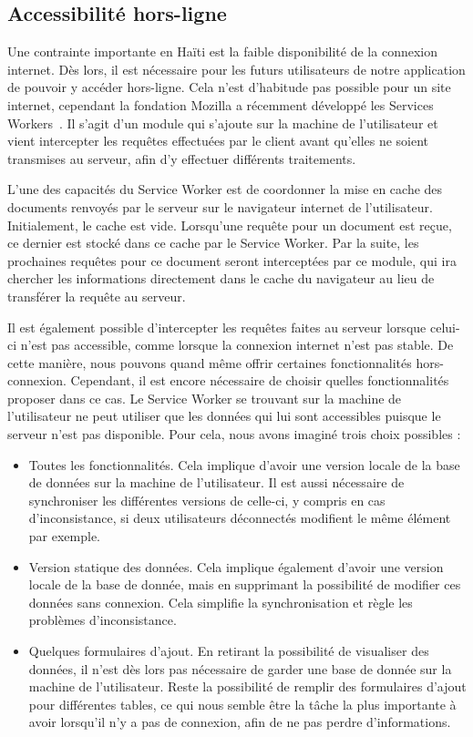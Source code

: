 \documentclass{EPL-master-thesis-covers-FR}
\begin{document}
			\subsection*{Accessibilité hors-ligne}
				\label{sec:service_worker}

				Une contrainte importante en Haïti est la faible disponibilité de la connexion internet. Dès lors, il est nécessaire pour les futurs utilisateurs de notre application de pouvoir y accéder hors-ligne. Cela n'est d'habitude pas possible pour un site internet, cependant la fondation Mozilla a récemment développé les Services Workers~\cite{ref:serviceworker}. Il s'agit d'un module qui s'ajoute sur la machine de l'utilisateur et vient intercepter les requêtes effectuées par le client avant qu'elles ne soient transmises au serveur, afin d'y effectuer différents traitements.

				L'une des capacités du Service Worker est de coordonner la mise en cache des documents renvoyés par le serveur sur le navigateur internet de l'utilisateur. Initialement, le cache est vide. Lorsqu'une requête pour un document est reçue, ce dernier est stocké dans ce cache par le Service Worker. Par la suite, les prochaines requêtes pour ce document seront interceptées par ce module, qui ira chercher les informations directement dans le cache du navigateur au lieu de transférer la requête au serveur.

				Il est également possible d'intercepter les requêtes faites au serveur lorsque celui-ci n'est pas accessible, comme lorsque la connexion internet n'est pas stable. De cette manière, nous pouvons quand même offrir certaines fonctionnalités hors-connexion. Cependant, il est encore nécessaire de choisir quelles fonctionnalités proposer dans ce cas. Le Service Worker se trouvant sur la machine de l'utilisateur ne peut utiliser que les données qui lui sont accessibles puisque le serveur n'est pas disponible. Pour cela, nous avons imaginé trois choix possibles :

				\begin{itemize}
					\item Toutes les fonctionnalités. Cela implique d'avoir une version locale de la base de données sur la machine de l'utilisateur. Il est aussi nécessaire de synchroniser les différentes versions de celle-ci, y compris en cas d'inconsistance, si deux utilisateurs déconnectés modifient le même élément par exemple.
					\item Version statique des données. Cela implique également d'avoir une version locale de la base de donnée, mais en supprimant la possibilité de modifier ces données sans connexion. Cela simplifie la synchronisation et règle les problèmes d'inconsistance.
					\item Quelques formulaires d'ajout. En retirant la possibilité de visualiser des données, il n'est dès lors pas nécessaire de garder une base de donnée sur la machine de l'utilisateur. Reste la possibilité de remplir des formulaires d'ajout pour différentes tables, ce qui nous semble être la tâche la plus importante à avoir lorsqu'il n'y a pas de connexion, afin de ne pas perdre d'informations.
				\end{itemize}
\end{document}
